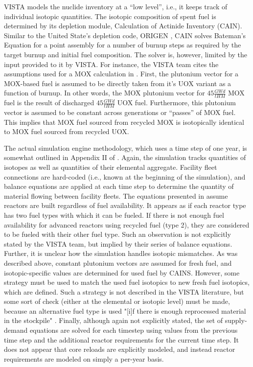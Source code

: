 VISTA models the nuclide inventory at a ``low level'', i.e., it keeps track of
individual isotopic quantities. The isotopic composition of spent fuel is
determined by its depletion module, Calculation of Actinide Inventory
(CAIN). Similar to the United State's depletion code, ORIGEN
\cite{bell_origen_1973}, CAIN solves Bateman's Equation for a point assembly for
a number of burnup steps as required by the target burnup and initial fuel
composition. The solver is, however, limited by the input provided to it by
VISTA. For instance, the VISTA team cites the assumptions used for a MOX
calculation in \cite{iaea_nuclear_2007}. First, the plutonium vector for a
MOX-based fuel is assumed to be directly taken from it's UOX variant as a
function of burnup. In other words, the MOX plutonium vector for $45 \frac{GW
  d}{tHM}$ MOX fuel is the result of discharged $45 \frac{GW d}{tHM}$ UOX
fuel. Furthermore, this plutonium vector is assumed to be constant across
generations or ``passes'' of MOX fuel. This implies that MOX fuel sourced from
recycled MOX is isotopically identical to MOX fuel sourced from recycled UOX.

The actual simulation engine methodology, which uses a time step of one year, is
somewhat outlined in Appendix II of \cite{iaea_nuclear_2007}. Again, the
simulation tracks quantities of isotopes as well as quantities of their
elemental aggregate. Facility fleet connections are hard-coded (i.e., known at
the beginning of the simulation), and balance equations are applied at each time
step to determine the quantity of material flowing between facility fleets. The
equations presented in \cite{iaea_nuclear_2007} assume reactors are built
regardless of fuel availability. It appears as if each reactor type has two fuel
types with which it can be fueled. If there is not enough fuel availability for
advanced reactors using recycled fuel (type 2), they are considered to be fueled
with their other fuel type. Such an observation is not explicitly stated by the
VISTA team, but implied by their series of balance equations. Further, it is
unclear how the simulation handles isotopic mismatches. As was described above,
constant plutonium vectors are assumed for fresh fuel, and isotopic-specific
values are determined for used fuel by CAINS. However, some strategy must be
used to match the used fuel isotopics to new fresh fuel isotopics, which are
defined. Such a strategy is not described in the VISTA literature, but some sort
of check (either at the elemental or isotopic level) must be made, because an
alternative fuel type is used "[i]f there is enough reprocessed material in the
stockpile" \cite{iaea_nuclear_2007}. Finally, although again not explicitly
stated, the set of supply-demand equations are solved for each timestep using
values from the previous time step and the additional reactor requirements for
the current time step. It does not appear that core reloads are explicitly
modeled, and instead reactor requirements are modeled on simply a per-year
basis.

